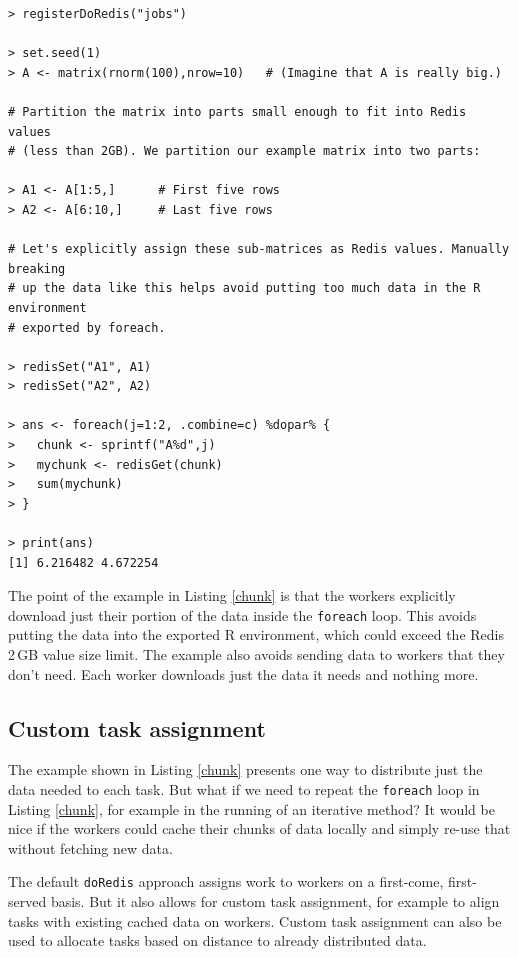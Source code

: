 \documentclass[12pt]{article}
\begin{document}
\begin{lstlisting}[float=!ht,caption=Explicitly breaking a problem up into chunks,basicstyle=\footnotesize\ttfamily,label=chunk]
> registerDoRedis("jobs")

> set.seed(1)
> A <- matrix(rnorm(100),nrow=10)   # (Imagine that A is really big.)

# Partition the matrix into parts small enough to fit into Redis values
# (less than 2GB). We partition our example matrix into two parts:

> A1 <- A[1:5,]      # First five rows
> A2 <- A[6:10,]     # Last five rows

# Let's explicitly assign these sub-matrices as Redis values. Manually breaking
# up the data like this helps avoid putting too much data in the R environment
# exported by foreach.

> redisSet("A1", A1)
> redisSet("A2", A2)

> ans <- foreach(j=1:2, .combine=c) %dopar% {
>   chunk <- sprintf("A%d",j)
>   mychunk <- redisGet(chunk)
>   sum(mychunk)
> }

> print(ans)
[1] 6.216482 4.672254
\end{lstlisting}

The point of the example in Listing \ref{chunk} is that the workers explicitly
download just their portion of the data inside the \verb+foreach+ loop. This
avoids putting the data into the exported R environment, which could exceed the
Redis 2\,GB value size limit. The example also avoids sending data to workers
that they don't need. Each worker downloads just the data it needs and nothing
more.


\subsection{Custom task assignment}

The example shown in Listing \ref{chunk} presents one way to distribute just
the data needed to each task. But what if we need to repeat the \verb+foreach+
loop in Listing \ref{chunk}, for example in the running of an iterative method?
It would be nice if the workers could cache their chunks of data locally and
simply re-use that without fetching new data.

The default \verb+doRedis+ approach assigns work to workers on a first-come,
first-served basis. But it also allows for custom task assignment, for example
to align tasks with existing cached data on workers. Custom task assignment can
also be used to allocate tasks based on distance to already distributed data.
\end{document}
